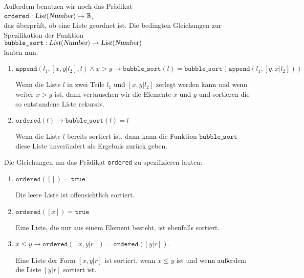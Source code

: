 Außerdem benutzen wir noch das Prädikat \\[0.1cm]
\hspace*{1.3cm} 
$\texttt{ordered}: \textsl{List}(\textsl{Number}) \rightarrow \mathbb{B}$, \\[0.1cm]
das überprüft, ob eine Liste geordnet ist.
Die bedingten Gleichungen
zur Spezifikation der Funktion \\[0.1cm]
\hspace*{1.3cm} 
$\texttt{bubble\_sort}: \textsl{List}(\textsl{Number}) \rightarrow \textsl{List}(\textsl{Number})$
\\[0.1cm]
lauten nun:
\begin{enumerate}
\item $\mathtt{append}(l_1, [x,y|l_2], l) \wedge x > y \rightarrow \mathtt{bubble\_sort}(l) = \mathtt{bubble\_sort}(\mathtt{append}(l_1, [y,x|l_2]))$

      Wenn die Liste $l$ in zwei Teile $l_1$ und $[x,y|l_2]$ zerlegt werden kann
      und wenn weiter $x>y$ ist, dann vertauschen wir die Elemente $x$ und $y$
      und sortieren die so entstandene Liste rekursiv.
\item $\mathtt{ordered}(l) \rightarrow \mathtt{bubble\_sort}(l) = l$

      Wenn die Liste $l$ bereits sortiert ist, dann kann die Funktion
      $\mathtt{bubble\_sort}$ diese Liste unverändert als Ergebnis zurück geben.
\end{enumerate}
Die Gleichungen um das Prädikat \texttt{ordered} zu spezifizieren lauten:
\begin{enumerate}
\item $\mathtt{ordered}([]) = \mathtt{true}$

      Die leere Liste ist offensichtlich sortiert.
\item $\mathtt{ordered}([x]) = \mathtt{true}$

      Eine Liste, die nur aus einem Element besteht, ist ebenfalls sortiert.
\item $x \leq y \rightarrow \mathtt{ordered}([x,y|r]) = \mathtt{ordered}([y|r])$.

      Eine Liste der Form $[x,y|r]$ ist sortiert, wenn $x \leq y$ ist und
      wenn außerdem die Liste $[y|r]$ sortiert ist.
\end{enumerate}

